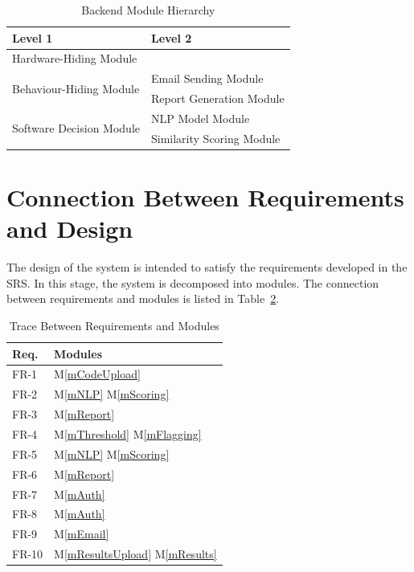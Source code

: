 \documentclass[12pt, titlepage]{article}
\newcommand{\mref}[1]{M\ref{#1}}
\begin{document}
\begin{table}[h!]
  \centering
  \begin{tabular}{p{} p{}}
  \toprule
  \textbf{Level 1} & \textbf{Level 2} \\
  \midrule
  {Hardware-Hiding Module} & ~ \\
  \midrule
  \multirow{2}{*}{Behaviour-Hiding Module} & Email Sending Module \\
  & Report Generation Module \\
  \midrule
  \multirow{2}{*}{Software Decision Module} & NLP Model Module \\
  & Similarity Scoring Module \\
  \bottomrule
  \end{tabular}
  \caption{Backend Module Hierarchy}
  \label{TblBMH}
\end{table}

\section{Connection Between Requirements and Design} \label{SecConnection}

The design of the system is intended to satisfy the requirements developed in
the SRS. In this stage, the system is decomposed into modules. The connection
between requirements and modules is listed in Table~\ref{TblRT}.
\begin{table}[H]
  \centering
  \begin{tabular}{p{} p{}}
  \toprule
  \textbf{Req.} & \textbf{Modules}\\
  \midrule
  FR-1 & \mref{mCodeUpload} \\
  FR-2 & \mref{mNLP} \mref{mScoring} \\
  FR-3 & \mref{mReport}\\
  FR-4 & \mref{mThreshold} \mref{mFlagging}\\
  FR-5 & \mref{mNLP} \mref{mScoring} \\
  FR-6 & \mref{mReport} \\
  FR-7 & \mref{mAuth} \\
  FR-8 & \mref{mAuth} \\
  FR-9 & \mref{mEmail} \\
  FR-10 & \mref{mResultsUpload} \mref{mResults}\\
  \bottomrule
  \end{tabular}
  \caption{Trace Between Requirements and Modules}
  \label{TblRT}
\end{table}
  
\end{document}
